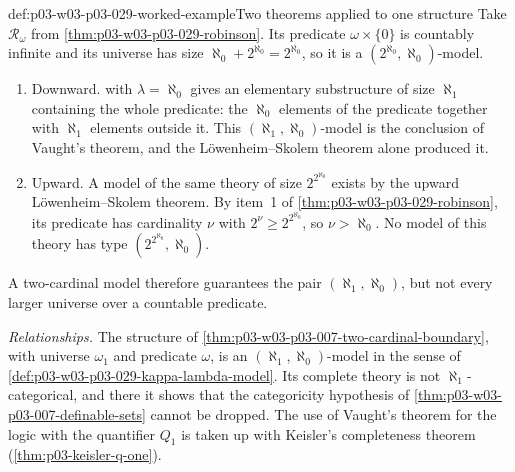 \begin{hbexample}{def:p03-w03-p03-029-worked-example}{Two theorems applied to one structure}
Take \(\mathcal R_\omega\) from \cref{thm:p03-w03-p03-029-robinson}. Its
predicate \(\omega\times\{0\}\) is countably infinite and its universe has
size \(\aleph_0+2^{\aleph_0}=2^{\aleph_0}\), so it is a
\((2^{\aleph_0},\aleph_0)\)-model.
\begin{enumerate}
  \item Downward.  with
        \(\lambda=\aleph_0\) gives an elementary substructure of size
        \(\aleph_1\) containing the whole predicate: the \(\aleph_0\)
        elements of the predicate together with \(\aleph_1\) elements
        outside it.
        This \((\aleph_1,\aleph_0)\)-model is the conclusion of Vaught's
        theorem, and the L\"owenheim--Skolem theorem alone produced it.
  \item Upward. A model of the same theory of size \(2^{2^{\aleph_0}}\)
        exists by the upward L\"owenheim--Skolem theorem. By item~1 of
        \cref{thm:p03-w03-p03-029-robinson}, its predicate has
        cardinality \(\nu\) with \(2^\nu\geq2^{2^{\aleph_0}}\), so
        \(\nu>\aleph_0\). No model of this theory has type
        \((2^{2^{\aleph_0}},\aleph_0)\).
\end{enumerate}
A two-cardinal model therefore guarantees the pair \((\aleph_1,\aleph_0)\),
but not every larger universe over a countable predicate.
\end{hbexample}

\emph{Relationships.} The structure of
\cref{thm:p03-w03-p03-007-two-cardinal-boundary}, with universe \(\omega_1\)
and predicate \(\omega\), is an \((\aleph_1,\aleph_0)\)-model in the sense of
\cref{def:p03-w03-p03-029-kappa-lambda-model}. Its complete theory is not
\(\aleph_1\)-categorical, and there it shows that the categoricity hypothesis
of \cref{thm:p03-w03-p03-007-definable-sets} cannot be dropped. The use of Vaught's theorem for the logic with the
quantifier \(Q_1\) is taken up with Keisler's completeness theorem
(\cref{thm:p03-keisler-q-one}).


